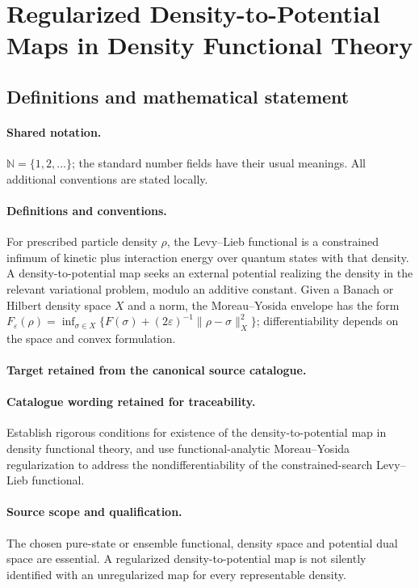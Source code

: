 \documentclass[11pt]{article}
\begin{document}
\section{Regularized Density-to-Potential Maps in Density Functional Theory}\label{statement}

\subsection{Definitions and mathematical statement}

\paragraph{Shared notation.}$\mathbb N=\{1,2,\ldots\}$; the standard number fields have their usual meanings. All additional conventions are stated locally.


\paragraph{Definitions and conventions.}
For prescribed particle density $\rho$, the Levy--Lieb functional is a constrained infimum of kinetic plus interaction energy over quantum states with that density. A density-to-potential map seeks an external potential realizing the density in the relevant variational problem, modulo an additive constant. Given a Banach or Hilbert density space $X$ and a norm, the Moreau--Yosida envelope has the form $F_\varepsilon(\rho)=\inf_{\sigma\in X}\{F(\sigma)+(2\varepsilon)^{-1}\|\rho-\sigma\|_X^2\}$; differentiability depends on the space and convex formulation.

\paragraph{Target retained from the canonical source catalogue.}
\paragraph{Catalogue wording retained for traceability.}
Establish rigorous conditions for existence of the density-to-potential map in density functional theory, and use functional-analytic Moreau–Yosida regularization to address the nondifferentiability of the constrained-search Levy–Lieb functional.

\paragraph{Source scope and qualification.}
The chosen pure-state or ensemble functional, density space and potential dual space are essential. A regularized density-to-potential map is not silently identified with an unregularized map for every representable density.
\end{document}
